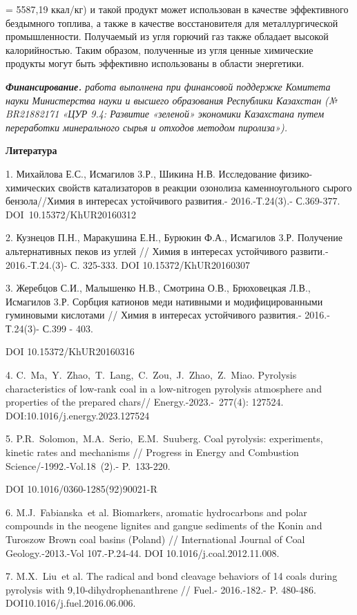 = 5587,19 ккал/кг) и такой продукт может использован в качестве
эффективного бездымного топлива, а также в качестве восстановителя для
металлургической промышленности. Получаемый из угля горючий газ также
обладает высокой калорийностью. Таким образом, полученные из угля ценные
химические продукты могут быть эффективно использованы в области
энергетики.

\emph{{\bfseries Финансирование.} работа выполнена при финансовой поддержке
Комитета науки Министерства науки и высшего образования Республики
Казахстан (№ BR21882171 «ЦУР 9.4: Развитие «зеленой» экономики
Казахстана путем переработки минерального сырья и отходов методом
пиролиза»).}

{\bfseries Литература}

1. Михайлова Е.С., Исмагилов 3.Р., Шикина Н.В. Исследование
физико-химических свойств катализаторов в реакции озонолиза
каменноугольного сырого бензола//Химия в интересах устойчивого
развития.- 2016.-Т.24(3).- С.369-377. DOI~10.15372/KhUR20160312

2. Кузнецов П.Н., Маракушина Е.Н., Бурюкин Ф.А., Исмагилов 3.Р.
Получение альтернативных пеков из углей // Химия в интересах устойчивого
развити.- 2016.-Т.24.(3)- С. 325-333. DOI 10.15372/KhUR20160307

3. Жеребцов С.И., Малышенко Н.В., Смотрина О.В., Брюховецкая Л.В.,
Исмагилов 3.Р. Сорбция катионов меди нативными и модифицированными
гуминовыми кислотами // Химия в интересах устойчивого развития.-
2016.-Т.24(3)- С.399 - 403.

DOI 10.15372/KhUR20160316

4. C.~Ma,~Y.~Zhao,~T.~Lang,~C.~Zou,~J.~Zhao,~Z.~Miao. Pyrolysis
characteristics of low-rank coal in a low-nitrogen pyrolysis atmosphere
and properties of the prepared chars// Energy.-2023.-~277(4): 127524.
DOI:10.1016/j.energy.2023.127524

5. P.R.~Solomon,~M.A.~Serio,~E.M.~Suuberg. Coal pyrolysis: experiments,
kinetic rates and mechanisms // Progress in Energy and Combustion
Science/-1992.-Vol.18~(2).- P.~133-220.

DOI 10.1016/0360-1285(92)90021-R

6. M.J.~Fabianska\emph{~}et al. Biomarkers, aromatic hydrocarbons and
polar compounds in the neogene lignites and gangue sediments of the
Konin and Turoszow Brown coal basins (Poland) // International Journal
of Coal Geology.-2013.-Vol 107.-P.24-44. DOI 10.1016/j.coal.2012.11.008.

7. M.X.~Liu\emph{~}et al. The radical and bond cleavage behaviors of 14
coals during pyrolysis with 9,10-dihydrophenanthrene // Fuel.-
2016.-182.- P. 480-486. DOI10.1016/j.fuel.2016.06.006.


